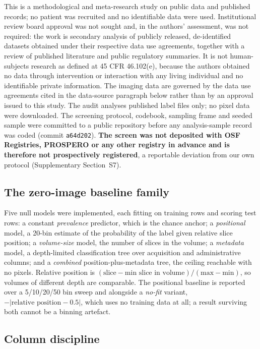 \documentclass[11pt,a4paper]{article}
\begin{document}
This is a methodological and meta-research study on public data and published
records; no patient was recruited and no identifiable data were used.
Institutional review board approval was not sought and, in the authors'
assessment, was not required: the work is secondary analysis of publicly
released, de-identified datasets obtained under their respective data use
agreements, together with a review of published literature and public regulatory
summaries. It is not human-subjects research as defined at 45 CFR 46.102(e),
because the authors obtained no data through intervention or interaction with any
living individual and no identifiable private information. The imaging data are
governed by the data use agreements cited in the data-source paragraph below
rather than by an approval issued to this study. The audit analyses published label files only; no pixel data
were downloaded. The screening protocol, codebook, sampling frame and seeded sample
were committed to a public repository before any analysis-sample record was coded
(commit \texttt{a64d202}). \textbf{The screen was not deposited with
OSF Registries, PROSPERO or any other registry in advance and is therefore not
prospectively registered}, a reportable deviation from our own protocol
(Supplementary Section~S7).

\subsection{The zero-image baseline family}

Five null models were implemented, each fitting on training rows and scoring
test rows: a constant \emph{prevalence} predictor, which is the chance anchor; a
\emph{positional} model, a 20-bin estimate of the probability of the label given
relative slice position; a \emph{volume-size} model, the number of slices in the
volume; a \emph{metadata} model, a depth-limited classification tree over
acquisition and administrative columns; and a \emph{combined} position-plus-metadata
tree, the ceiling reachable with no pixels. Relative
position is $(\text{slice}-\text{min slice in volume})/(\text{max}-\text{min})$,
so volumes of different depth are comparable. The positional baseline is reported
over a 5/10/20/50 bin sweep and alongside a \emph{no-fit} variant,
$-\lvert\text{relative position}-0.5\rvert$, which uses no training data at all;
a result surviving both cannot be a binning artefact.

\subsection{Column discipline}
\end{document}
